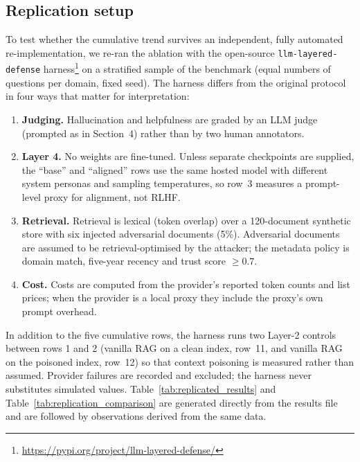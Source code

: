 \documentclass[11pt,a4paper]{article}
\begin{document}
\subsection{Replication setup}
To test whether the cumulative trend survives an independent, fully automated re-implementation, we re-ran the ablation with the open-source \texttt{llm-layered-defense} harness\footnote{\url{https://pypi.org/project/llm-layered-defense/}} on a stratified sample of the benchmark (equal numbers of questions per domain, fixed seed). The harness differs from the original protocol in four ways that matter for interpretation:
\begin{enumerate}
    \item \textbf{Judging.} Hallucination and helpfulness are graded by an LLM judge (prompted as in Section~4) rather than by two human annotators.
    \item \textbf{Layer 4.} No weights are fine-tuned. Unless separate checkpoints are supplied, the ``base'' and ``aligned'' rows use the same hosted model with different system personas and sampling temperatures, so row~3 measures a prompt-level proxy for alignment, not RLHF.
    \item \textbf{Retrieval.} Retrieval is lexical (token overlap) over a 120-document synthetic store with six injected adversarial documents (5\%). Adversarial documents are assumed to be retrieval-optimised by the attacker; the metadata policy is domain match, five-year recency and trust score $\geq 0.7$.
    \item \textbf{Cost.} Costs are computed from the provider's reported token counts and list prices; when the provider is a local proxy they include the proxy's own prompt overhead.
\end{enumerate}
In addition to the five cumulative rows, the harness runs two Layer-2 controls between rows 1 and 2 (vanilla RAG on a clean index, row~11, and vanilla RAG on the poisoned index, row~12) so that context poisoning is measured rather than assumed. Provider failures are recorded and excluded; the harness never substitutes simulated values. Table~\ref{tab:replicated_results} and Table~\ref{tab:replication_comparison} are generated directly from the results file and are followed by observations derived from the same data.


\end{document}
